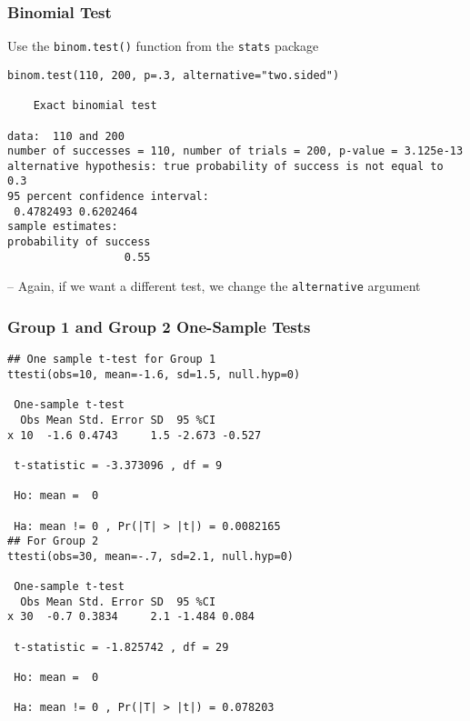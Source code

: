 \documentclass[pdf]{beamer}
\begin{document}
\begin{frame}[fragile]
\frametitle{Binomial Test}
Use the \texttt{binom.test()} function from the \texttt{stats} package
{\fontsize{6pt}{7.2}\selectfont
\begin{verbatim}
binom.test(110, 200, p=.3, alternative="two.sided")

	Exact binomial test

data:  110 and 200
number of successes = 110, number of trials = 200, p-value = 3.125e-13
alternative hypothesis: true probability of success is not equal to 0.3
95 percent confidence interval:
 0.4782493 0.6202464
sample estimates:
probability of success 
                  0.55 
\end{verbatim}}
-- Again, if we want a different test, we change the \texttt{alternative} argument
\end{frame}

\begin{frame}[fragile]
\frametitle{Group 1 and Group 2 One-Sample Tests}
{\fontsize{6pt}{7.2}\selectfont
\begin{verbatim}
## One sample t-test for Group 1
ttesti(obs=10, mean=-1.6, sd=1.5, null.hyp=0)

 One-sample t-test 
  Obs Mean Std. Error SD  95 %CI       
x 10  -1.6 0.4743     1.5 -2.673 -0.527

 t-statistic = -3.373096 , df = 9 

 Ho: mean =  0 

 Ha: mean != 0 , Pr(|T| > |t|) = 0.0082165 
## For Group 2
ttesti(obs=30, mean=-.7, sd=2.1, null.hyp=0)

 One-sample t-test 
  Obs Mean Std. Error SD  95 %CI      
x 30  -0.7 0.3834     2.1 -1.484 0.084

 t-statistic = -1.825742 , df = 29 

 Ho: mean =  0 

 Ha: mean != 0 , Pr(|T| > |t|) = 0.078203 
\end{verbatim}}
\end{frame}
\end{document}
